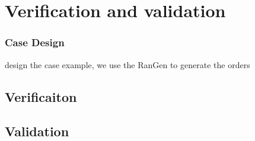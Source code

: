 \section{Verification and validation} %
\label{sec:verification_and_validation}
\subsubsection{Case Design} %
\label{ssub:case_design}
design the case example, we use the RanGen\cite{Demeulemeester2003,Vanhoucke2008} to generate the orders

\subsection{Verificaiton} %
\label{sub:verificaiton}

\subsection{Validation} %
\label{sub:validation}

